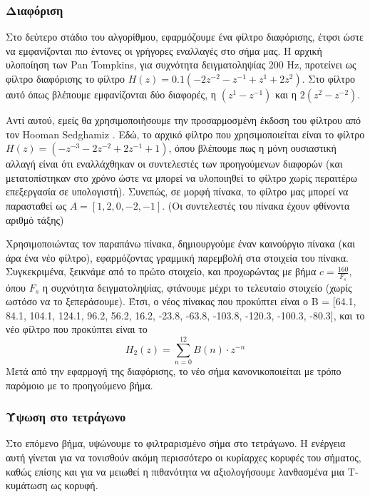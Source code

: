 \subsubsection*{Διαφόριση}

Στο δεύτερο στάδιο του αλγορίθμου, εφαρμόζουμε ένα φίλτρο διαφόρισης, έτφσι ώστε να εμφανίζονται πιο έντονες οι γρήγορες εναλλαγές στο σήμα μας. Η αρχική υλοποίηση των Pan Tompkins, για συχνότητα δειγματοληψίας 200 Hz, προτείνει ως φίλτρο διαφόρισης το φίλτρο $H(z) = 0.1(-2z^{-2} - z^{-1} + z^1 +2z^2)$. Στο φίλτρο αυτό όπως βλέπουμε εμφανίζονται δύο διαφορές, η $(z^1-z^{-1})$ και η $2(z^2 - z^{-2})$. 

Αντί αυτού, εμείς θα χρησιμοποιήσουμε την προσαρμοσμένη έκδοση του φίλτρου από τον Hooman Sedghamiz \cite{pan_tompkins_matlab}. Εδώ, το αρχικό φίλτρο που χρησιμοποιείται είναι το φίλτρο $H(z) = (-z^{-3} - 2z^{-2} + 2z^{-1} + 1)$, όπου βλέπουμε πως η μόνη ουσιαστική αλλαγή είναι ότι εναλλάχθηκαν οι συντελεστές των προηγούμενων διαφορών (και μετατοπίστηκαν στο χρόνο ώστε να μπορεί να υλοποιηθεί το φίλτρο χωρίς περαιτέρω επεξεργασία σε υπολογιστή). Συνεπώς, σε μορφή πίνακα, το φίλτρο μας μπορεί να παρασταθεί ως $A = [1, 2, 0, -2, -1]$. (Οι συντελεστές του πίνακα έχουν φθίνοντα αριθμό τάξης)

Χρησιμοποιώντας τον παραπάνω πίνακα, δημιουργούμε έναν καινούργιο πίνακα (και άρα ένα νέο φίλτρο), εφαρμόζοντας γραμμική παρεμβολή στα στοιχεία του πίνακα. Συγκεκριμένα, ξεικνάμε από το πρώτο στοιχείο, και προχωρώντας με βήμα $c = \frac{160}{F_s}$, όπου $F_s$ η συχνότητα δειγματοληψίας, φτάνουμε μέχρι το τελευταίο στοιχείο (χωρίς ωστόσο να το ξεπεράσουμε). Έτσι, ο νέος πίνακας που προκύπτει είναι ο B = [64.1, 84.1, 104.1, 124.1, 96.2, 56.2, 16.2, -23.8, -63.8, -103.8, -120.3, -100.3, -80.3], και το νέο φίλτρο που προκύπτει είναι το 
\begin{equation}
\label{eq:derivation}
   H_2(z) =  \sum_{n=0}^{12}B(n)\cdot z^{-n}
\end{equation}
Μετά από την εφαρμογή της διαφόρισης, το νέο σήμα κανονικοποιείται με τρόπο παρόμοιο με το προηγούμενο βήμα.

\subsubsection*{Ύψωση στο τετράγωνο}

Στο επόμενο βήμα, υψώνουμε το φιλτραρισμένο σήμα στο τετράγωνο. Η ενέργεια αυτή γίνεται για να τονισθούν ακόμη περισσότερο οι κυρίαρχες κορυφές του σήματος, καθώς επίσης και για να μειωθεί η πιθανότητα να αξιολογήσουμε λανθασμένα μια Τ-κυμάτωση ως κορυφή.


